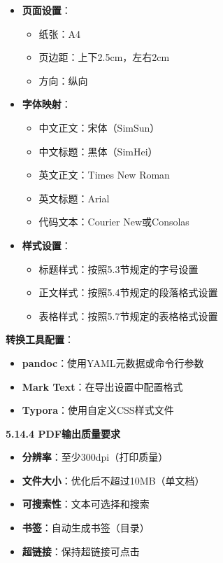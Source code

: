 \documentclass[12pt,a4paper]{article}
\numberwithin{equation}{section}  %
\begin{document}
\begin{itemize}
\item \textbf{页面设置}：
\begin{itemize}
\item 纸张：A4
\item 页边距：上下2.5cm，左右2cm
\item 方向：纵向

\end{itemize}
\item \textbf{字体映射}：
\begin{itemize}
\item 中文正文：宋体（SimSun）
\item 中文标题：黑体（SimHei）
\item 英文正文：Times New Roman
\item 英文标题：Arial
\item 代码文本：Courier New或Consolas

\end{itemize}
\item \textbf{样式设置}：
\begin{itemize}
\item 标题样式：按照5.3节规定的字号设置
\item 正文样式：按照5.4节规定的段落格式设置
\item 表格样式：按照5.7节规定的表格格式设置
\end{itemize}
\end{itemize}

\textbf{转换工具配置}：

\begin{itemize}
\item \textbf{pandoc}：使用YAML元数据或命令行参数
\item \textbf{Mark Text}：在导出设置中配置格式
\item \textbf{Typora}：使用自定义CSS样式文件
\end{itemize}

\textbf{5.14.4 PDF输出质量要求}

\begin{itemize}
\item \textbf{分辨率}：至少300dpi（打印质量）
\item \textbf{文件大小}：优化后不超过10MB（单文档）
\item \textbf{可搜索性}：文本可选择和搜索
\item \textbf{书签}：自动生成书签（目录）
\item \textbf{超链接}：保持超链接可点击
\end{itemize}
\end{document}
